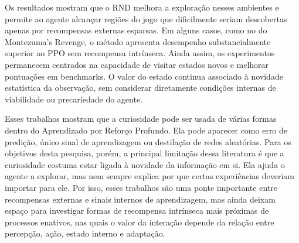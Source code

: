 Os resultados mostram que o RND melhora a exploração nesses ambientes e permite ao agente alcançar regiões do jogo que dificilmente seriam descobertas apenas por recompensas externas esparsas. Em alguns casos, como no do Montezuma's Revenge, o método apresenta desempenho substancialmente superior ao PPO sem recompensa intrínseca. Ainda assim, os experimentos permanecem centrados na capacidade de visitar estados novos e melhorar pontuações em benchmarks. O valor do estado continua associado à novidade estatística da observação, sem considerar diretamente condições internas de viabilidade ou precariedade do agente.


Esses trabalhos mostram que a curiosidade pode ser usada de várias formas dentro do Aprendizado por Reforço Profundo. Ela pode aparecer como erro de predição, único sinal de aprendizagem ou destilação de redes aleatórias. Para os objetivos desta pesquisa, porém, a principal limitação dessa literatura é que a curiosidade costuma estar ligada à novidade da informação em si. Ela ajuda o agente a explorar, mas nem sempre explica por que certas experiências deveriam importar para ele. Por isso, esses trabalhos são uma ponte importante entre recompensas externas e sinais internos de aprendizagem, mas ainda deixam espaço para investigar formas de recompensa intrínseca mais próximas de processos enativos, nas quais o valor da interação depende da relação entre percepção, ação, estado interno e adaptação.
